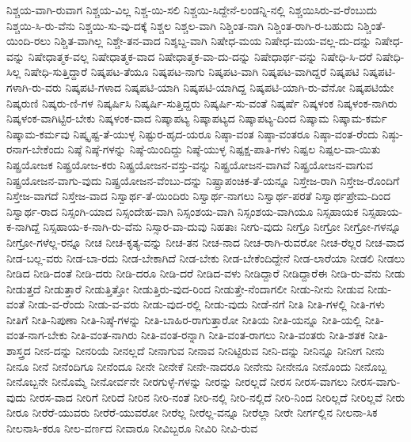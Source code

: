 {ನಿಶ್ಚಯ-ವಾಗಿ-ರುವಾಗ
ನಿಶ್ಚಯ-ವಿಲ್ಲ
ನಿಶ್ಚ-ಯಿ-ಸಲಿ
ನಿಶ್ಚಯಿ-ಸಿದ್ದೇನೆ-ಲಂಡನ್ನಿ-ನಲ್ಲಿ
ನಿಶ್ಚಯಿಸಿರು-ವ-ರೆಂಬುದು
ನಿಶ್ಚಯಿ-ಸಿ-ರು-ವೆನು
ನಿಶ್ಚಯಿ-ಸು-ವು-ದಕ್ಕೆ
ನಿಶ್ಚಲ
ನಿಶ್ಚಲ-ವಾಗಿ
ನಿಶ್ಚಿಂತ-ನಾಗಿ
ನಿಶ್ಚಿಂತ-ರಾಗಿ-ರ-ಬಹುದು
ನಿಶ್ಚಿಂತೆ-ಯಿಂದಿ-ರಲು
ನಿಶ್ಚಿತ-ವಾಗಿಲ್ಲ
ನಿಶ್ಚೇ-ತನ-ವಾದ
ನಿಶ್ಶಬ್ದ-ವಾಗಿ
ನಿಷೇಧ-ಮಯ
ನಿಷೇಧ-ಮಯ-ವಲ್ಲ-ದು-ದನ್ನು
ನಿಷೇಧ-ವನ್ನು
ನಿಷೇಧಾತ್ಮಕ-ವಲ್ಲ
ನಿಷೇಧಾತ್ಮಕ-ವಾದ
ನಿಷೇಧಾತ್ಮಕ-ವಾ-ದು-ದನ್ನು
ನಿಷೇಧಾರ್ಥ-ವನ್ನು
ನಿಷೇಧಿ-ಸಿ-ದರೆ
ನಿಷೇಧಿ-ಸಿಲ್ಲ
ನಿಷೇಧಿ-ಸುತ್ತಿದ್ದಾರೆ
ನಿಷ್ಕಪಟ-ತೆಯೂ
ನಿಷ್ಕಪಟ-ನಾಗು
ನಿಷ್ಕಪಟ-ವಾಗಿ
ನಿಷ್ಕಪಟ-ವಾಗಿದ್ದರೆ
ನಿಷ್ಕಪಟಿ
ನಿಷ್ಕಪಟಿ-ಗಳಾಗಿ-ರು-ವರು
ನಿಷ್ಕಪಟಿ-ಗಳಾದ
ನಿಷ್ಕಪಟಿ-ಯಾಗಿ
ನಿಷ್ಕಪಟಿ-ಯಾಗಿದ್ದ
ನಿಷ್ಕಪಟಿ-ಯಾಗಿ-ರು-ವೆನೋ
ನಿಷ್ಕಪಟಿಯೇ
ನಿಷ್ಕರುಣಿ
ನಿಷ್ಕರು-ಣಿ-ಗಳ
ನಿಷ್ಕರ್ಷಿಸಿ
ನಿಷ್ಕರ್ಷಿ-ಸುತ್ತಿದ್ದರು
ನಿಷ್ಕರ್ಷಿ-ಸು-ವಂತೆ
ನಿಷ್ಕರ್ಷೆ
ನಿಷ್ಕಳಂಕ
ನಿಷ್ಕಳಂಕ-ನಾಗಿರು
ನಿಷ್ಕಳಂಕ-ವಾಗಿಟ್ಟಿರ-ಬೇಕು
ನಿಷ್ಕಳಂಕ-ವಾದ
ನಿಷ್ಕಾಪಟ್ಯ
ನಿಷ್ಕಾಪಟ್ಯದ
ನಿಷ್ಕಾಪಟ್ಯ-ದಿಂದ
ನಿಷ್ಕಾಮ
ನಿಷ್ಕಾಮ-ಕರ್ಮ
ನಿಷ್ಕಾಮ-ಕರ್ಮವು
ನಿಷ್ಕೃಷ್ಟ-ತೆ-ಯುಳ್ಳ
ನಿಷ್ಟುರ-ಹೃದ-ಯರೂ
ನಿಷ್ಠಾ-ವಂತ
ನಿಷ್ಠಾ-ವಂತರೂ
ನಿಷ್ಠಾ-ವಂತ-ರೆಂದು
ನಿಷ್ಠು-ರನಾಗ-ಬೇಕೆಂದು
ನಿಷ್ಠೆ
ನಿಷ್ಠೆ-ಗಳನ್ನು
ನಿಷ್ಠೆ-ಯಿಂದಿದ್ದು
ನಿಷ್ಠೆ-ಯುಳ್ಳ
ನಿಷ್ಪಕ್ಷ-ಪಾತಿ-ಗಳು
ನಿಷ್ಪಲ
ನಿಷ್ಪಲ-ವಾ-ಯಿತು
ನಿಷ್ಪ್ರಯೋಜಕ
ನಿಷ್ಪ್ರಯೋಜ-ಕರು
ನಿಷ್ಪ್ರಯೋಜನ-ವಸ್ತು-ವನ್ನು
ನಿಷ್ಪ್ರಯೋಜನ-ವಾಗಿವೆ
ನಿಷ್ಪ್ರಯೋಜನ-ವಾಗುವ
ನಿಷ್ಪ್ರಯೋಜನ-ವಾಗು-ವುದು
ನಿಷ್ಪ್ರಯೋಜನ-ವೆಂಬು-ದನ್ನು
ನಿಷ್ಪ್ರಾಪಂಚಿಕ-ತೆ-ಯನ್ನೂ
ನಿಸ್ತೇಜ-ರಾಗಿ
ನಿಸ್ತೇಜ-ರೊಂದಿಗೆ
ನಿಸ್ತೇಜ-ವಾಗದೆ
ನಿಸ್ತೇಜ-ವಾದ
ನಿಸ್ವಾರ್ಥ-ತೆ-ಯಿಂದಿರು
ನಿಸ್ವಾರ್ಥ-ನಾಗಲು
ನಿಸ್ವಾರ್ಥ-ಪರತೆ
ನಿಸ್ವಾರ್ಥಪ್ರೇಮ-ದಿಂದ
ನಿಸ್ವಾರ್ಥ-ರಾದ
ನಿಸ್ಸಂಗಿ-ಯಾದ
ನಿಸ್ಸಂದೇಹ-ವಾಗಿ
ನಿಸ್ಸಂಶಯ-ವಾಗಿ
ನಿಸ್ಸಂಶಯ-ವಾಗಿಯೂ
ನಿಸ್ಸಹಾಯಕ
ನಿಸ್ಸಹಾಯ-ಕ-ನಾಗಿದ್ದೆ
ನಿಸ್ಸಹಾಯ-ಕ-ನಾಗಿ-ರು-ವೆನು
ನಿಸ್ಸಾರ-ವಾ-ದುವು
ನಿಹತಾಃ
ನೀಗು-ವುದು
ನೀಗ್ರೊ
ನೀಗ್ರೋ
ನೀಗ್ರೋ-ಗಳನ್ನೂ
ನೀಗ್ರೋ-ಗಳೆಲ್ಲ-ರನ್ನೂ
ನೀಚ
ನೀಚ-ಕೃತ್ಯ-ವನ್ನು
ನೀಚ-ತನ
ನೀಚ-ನಾದ
ನೀಚ-ರಾಗಿ-ರುವರೋ
ನೀಚ-ರೆಲ್ಲರ
ನೀಚ-ವಾದ
ನೀಡ-ಬಲ್ಲ-ವರು
ನೀಡ-ಬಾ-ರದು
ನೀಡ-ಬೇಕಾಗಿದೆ
ನೀಡ-ಬೇಕು
ನೀಡ-ಬೇಕೆಂದಿದ್ದೇನೆ
ನೀಡ-ಲಾರೆಯಾ
ನೀಡಲಿ
ನೀಡಲು
ನೀಡಿದ
ನೀಡಿ-ದಂತೆ
ನೀಡಿ-ದರು
ನೀಡಿ-ದರೂ
ನೀಡಿ-ದರೆ
ನೀಡಿದ-ವಳು
ನೀಡಿದ್ದಾರೆ
ನೀಡಿದ್ದಾರೆಈ
ನೀಡಿ-ರು-ವೆನು
ನೀಡು
ನೀಡುತ್ತದೆ
ನೀಡುತ್ತಾರೆ
ನೀಡುತ್ತಿತ್ತೋ
ನೀಡುತ್ತಿರು-ವುದ-ರಿಂದ
ನೀಡುತ್ತೇ-ನೆಂದಾಗಲೀ
ನೀಡು-ನೀನು
ನೀಡುವ
ನೀಡು-ವಂತೆ
ನೀಡು-ವ-ರೆಂದು
ನೀಡು-ವ-ವರು
ನೀಡು-ವುದ-ರಲ್ಲಿ
ನೀಡು-ವುದು
ನೀಡೆ-ನಗೆ
ನೀತಿ
ನೀತಿ-ಗಳಲ್ಲಿ
ನೀತಿ-ಗಳು
ನೀತಿಗೆ
ನೀತಿ-ನಿಪುಣಾ
ನೀತಿ-ನಿಷ್ಠೆ-ಗಳನ್ನು
ನೀತಿ-ಬಾಹಿರ-ರಾಗುತ್ತಾರೋ
ನೀತಿಯ
ನೀತಿ-ಯನ್ನೂ
ನೀತಿ-ಯಲ್ಲಿ
ನೀತಿ-ವಂತ-ನಾಗ-ಬೇಕು
ನೀತಿ-ವಂತ-ನಾಗಿರು
ನೀತಿ-ವಂತ-ರನ್ನಾಗಿ
ನೀತಿ-ವಂತ-ರಾಗಲು
ನೀತಿ-ವಂತರು
ನೀತಿ-ಶತಕ
ನೀತಿ-ಶಾಸ್ತ್ರದ
ನೀನ-ದನ್ನು
ನೀನರಿಯೆ
ನೀನಲ್ಲದೆ
ನೀನಾಗುವ
ನೀನಾವ
ನೀನಿಟ್ಟಿರುವ
ನೀನಿ-ದನ್ನು
ನೀನಿನ್ನೂ
ನೀನೀಗ
ನೀನು
ನೀನೂ
ನೀನೆ
ನೀನೆಂದಿಗೂ
ನೀನೆಂದೂ
ನೀನೇ
ನೀನೇಕೆ
ನೀನೇ-ನಾದರೂ
ನೀನೇನು
ನೀನೇನೂ
ನೀನೊಂದು
ನೀನೊಬ್ಬ
ನೀನೊಬ್ಬನೇ
ನೀನೊಮ್ಮೆ
ನೀನೋರ್ವನೇ
ನೀರಗುಳ್ಳೆ-ಗಳನ್ನು
ನೀರನ್ನು
ನೀರಲ್ಲದೆ
ನೀರಸ
ನೀರಸ-ವಾಗಲು
ನೀರಸ-ವಾಗು-ವುದು
ನೀರಸ-ವಾದ
ನೀರಿಗೆ
ನೀರಿದೆ
ನೀರಿನ
ನೀರಿ-ನಂತೆ
ನೀರಿ-ನಲ್ಲಿ
ನೀರಿ-ನಲ್ಲಿದೆ
ನೀರಿ-ನಿಂದ
ನೀರಿಲ್ಲದೆ
ನೀರಿಲ್ಲವೆ
ನೀರು
ನೀರೂ
ನೀರೆರೆ-ಯುವರು
ನೀರೆರೆ-ಯುವರೋ
ನೀರೆಲ್ಲ
ನೀರೆಲ್ಲ-ವನ್ನೂ
ನೀರೆಲ್ಲಾ
ನೀರೇ
ನೀರ್ಗಲ್ಲಿನ
ನೀಲನಾ-ಸಿಕ
ನೀಲನಾಸಿ-ಕರೂ
ನೀಲ-ವರ್ಣದ
ನೀವಾರೂ
ನೀವಿಬ್ಬರೂ
ನೀವಿರಿ
ನೀವಿ-ರುವ
}
